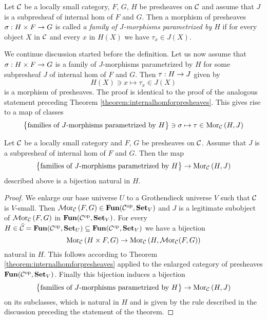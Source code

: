 \begin{definition}
Let ${\mathcal C}$ be a locally small category, $F$, $G$, $H$ be presheaves on ${\mathcal C}$ and assume that $J$ is a subpresheaf of internal hom of $F$ and $G$. Then a morphism of presheaves $\sigma:H\times F\rightarrow G$ is called \textit{a family of $J$-morphisms parametrized by $H$} if for every object $X$ in ${\mathcal C}$ and every $x$ in $H(X)$ we have $\tau_x\in J(X)$.
\end{definition}
\noindent
We continue discussion started before the definition. Let us now assume that $\sigma:H\times F\rightarrow G$ is a family of $J$-morphisms parametrized by $H$ for some subpresheaf $J$ of internal hom of $F$ and $G$. Then $\tau:H\rightarrow J$ given by
$$H(X)\ni x\mapsto \tau_x\in J(X)$$
is a morphism of presheaves. The proof is identical to the proof of the analogous statement preceding Theorem \ref{theorem:internalhomforpresheaves}. This gives rise to a map of classes
$$\big\{\mbox{families of $J$-morphisms parametrized by }H\big\}\ni \sigma \mapsto \tau \in \mathrm{Mor}_{{\mathcal C}}\left(H,J\right)$$

\begin{theorem}\label{theorem:subpresheavesofinternalhom}
Let ${\mathcal C}$ be a locally small category and $F$, $G$ be presheaves on ${\mathcal C}$. Assume that $J$ is a subpresheaf of internal hom of $F$ and $G$. Then the map 
$$\big\{\mbox{families of $J$-morphisms parametrized by }H\big\}\rightarrow \mathrm{Mor}_{{\mathcal C}}\left(H,J\right)$$
described above is a bijection natural in $H$.
\end{theorem}
\begin{proof}
We enlarge our base universe $U$ to a Grothendieck universe $V$ such that ${\mathcal C}$ is $V$-small. Then $\mathcal{M}\mathrm{or}_{{\mathcal C}}\left(F,G\right)\in \mathbf{Fun}({\mathcal C}^{\mathrm{op}},\mathbf{Set}_V)$ and $J$ is a legitimate subobject of $\mathcal{M}\mathrm{or}_{{\mathcal C}}\left(F,G\right)$ in $\mathbf{Fun}({\mathcal C}^{\mathrm{op}},\mathbf{Set}_V)$. For every $H\in \widehat{{\mathcal C}} = \mathbf{Fun}({\mathcal C}^{\mathrm{op}},\mathbf{Set}_U)\subseteq \mathbf{Fun}({\mathcal C}^{\mathrm{op}},\mathbf{Set}_V)$ we have a bijection
$$\mathrm{Mor}_{{\mathcal C}}\left(H\times F, G\right)\rightarrow \mathrm{Mor}_{{\mathcal C}}\left(H,\mathcal{M}\mathrm{or}_{{\mathcal C}}(F,G)\right)$$
natural in $H$. This follows according to Theorem \ref{theorem:internalhomforpresheaves} applied to the enlarged category of presheaves $\mathbf{Fun}({\mathcal C}^{\mathrm{op}},\mathbf{Set}_V)$. Finally this bijection induces a bijection
$$\big\{\mbox{families of $J$-morphisms parametrized by }H\big\}\rightarrow \mathrm{Mor}_{{\mathcal C}}\left(H,J\right)$$
on its subclasses, which is natural in $H$ and is given by the rule described in the discussion preceding the statement of the theorem.
\end{proof}

